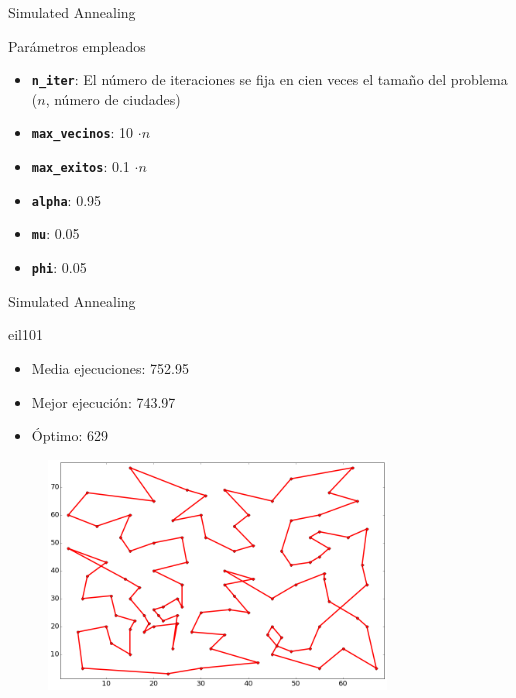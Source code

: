 \documentclass[ignorenonframetext,]{beamer}
\begin{document}
\begin{frame}{Simulated Annealing}

\begin{block}{Parámetros empleados}

\begin{itemize}
\item
  \textbf{\texttt{n\_iter}}: El número de iteraciones se fija en cien
  veces el tamaño del problema ($n$, número de ciudades)
\item
  \textbf{\texttt{max\_vecinos}}: 10 $\cdot n$
\item
  \textbf{\texttt{max\_exitos}}: 0.1 $\cdot n$
\item
  \textbf{\texttt{alpha}}: 0.95
\item
  \textbf{\texttt{mu}}: 0.05
\item
  \textbf{\texttt{phi}}: 0.05
\end{itemize}

\end{block}

\end{frame}

\begin{frame}{Simulated Annealing}

\begin{block}{eil101}

\begin{itemize}
\item
  Media ejecuciones: 752.95
\item
  Mejor ejecución: 743.97
\item
  Óptimo: 629
\end{itemize}

\begin{figure}[htbp]
\centering
\includegraphics[width=0.8\textwidth]{./images/eil101sa.png}
\end{figure}

\end{block}

\end{frame}
\end{document}
